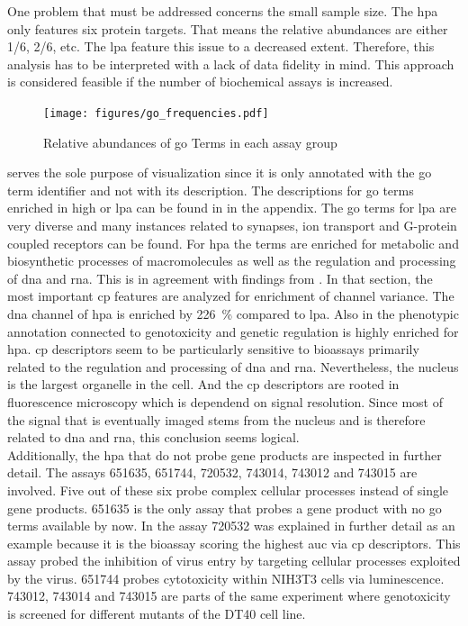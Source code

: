 One problem that must be addressed concerns the small sample size. The \acl{hpa} only features six protein targets. That means the relative abundances are either \num{1/6}, \num{2/6}, etc. The \acl{lpa} feature this issue to a decreased extent. Therefore, this analysis has to be interpreted with a lack of data fidelity in mind. This approach is considered feasible if the number of biochemical assays is increased.
\begin{figure}[H]
	\centering
	\texttt{[image: figures/go\_frequencies.pdf]}
	\caption[Relative Abundances of \ac{go} Terms in Each Assay Group]{Relative abundances of \ac{go} Terms in each assay group}
	\label{fig:gotermabundances}
\end{figure}
 serves the sole purpose of visualization since it is only annotated with the \ac{go} term identifier and not with its description. The descriptions for \ac{go} terms enriched in high or \acl{lpa} can be found in  in the appendix. The \ac{go} terms for \acl{lpa} are very diverse and many instances related to synapses, ion transport and G-protein coupled receptors can be found. For \acl{hpa} the terms are enriched for metabolic and biosynthetic processes of macromolecules as well as the regulation and processing of \ac{dna} and \acs{rna}. This is in agreement with findings from . In that section, the most important \ac{cp} features are analyzed for enrichment of channel variance. The \ac{dna} channel of \acl{hpa} is enriched by \SI{226}{\percent} compared to \acl{lpa}. Also in  the phenotypic annotation connected to genotoxicity and genetic regulation is highly enriched for \acl{hpa}. \ac{cp} descriptors seem to be particularly sensitive to bioassays primarily related to the regulation and processing of \ac{dna} and \ac{rna}. Nevertheless, the nucleus is the largest organelle in the cell. And the \ac{cp} descriptors are rooted in fluorescence microscopy which is dependend on signal resolution. Since most of the signal that is eventually imaged stems from the nucleus and is therefore related to \ac{dna} and \ac{rna}, this conclusion seems logical.\\
Additionally, the \acl{hpa} that do not probe gene products are inspected in further detail. The assays 651635, 651744, 720532, 743014, 743012 and 743015 are involved. Five out of these six probe complex cellular processes instead of single gene products. 651635 is the only assay that probes a gene product with no \ac{go} terms available by now. In  the assay 720532 was explained in further detail as an example because it is the bioassay scoring the highest \ac{auc} via \ac{cp} descriptors. This assay probed the inhibition of virus entry by targeting cellular processes exploited by the virus. 651744 probes cytotoxicity within NIH3T3 cells via luminescence. 743012, 743014 and 743015 are parts of the same experiment where genotoxicity is screened for different mutants of the DT40 cell line.\\
